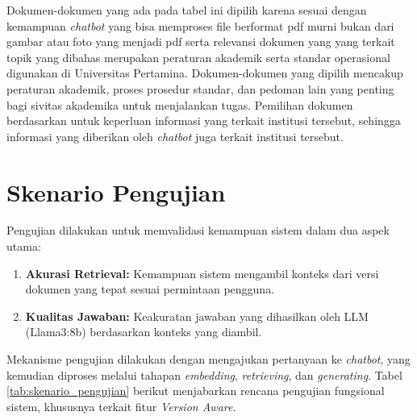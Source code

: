 Dokumen-dokumen yang ada pada tabel ini dipilih karena sesuai dengan kemampuan \textit{chatbot} yang bisa memproses file berformat pdf murni
bukan dari gambar atau foto yang menjadi pdf serta relevansi dokumen yang yang terkait topik yang dibahas merupakan peraturan akademik serta standar
operasional digunakan di Universitas Pertamina. Dokumen-dokumen yang dipilih mencakup peraturan akademik, proses prosedur standar, dan pedoman lain
yang penting bagi sivitas akademika untuk menjalankan tugas. Pemilihan dokumen berdasarkan untuk keperluan informasi yang terkait institusi tersebut, sehingga
informasi yang diberikan oleh \textit{chatbot} juga terkait institusi tersebut.

\newpage
\section{Skenario Pengujian}
\label{sec:skenario_uji}

Pengujian dilakukan untuk memvalidasi kemampuan sistem dalam dua aspek utama:
\begin{enumerate}
    \item \textbf{Akurasi Retrieval:} Kemampuan sistem mengambil konteks dari versi dokumen yang tepat sesuai permintaan pengguna.
    \item \textbf{Kualitas Jawaban:} Keakuratan jawaban yang dihasilkan oleh LLM (Llama3:8b) berdasarkan konteks yang diambil.
\end{enumerate}

Mekanisme pengujian dilakukan dengan mengajukan pertanyaan ke \textit{chatbot}, yang kemudian diproses melalui tahapan \textit{embedding}, \textit{retrieving}, dan \textit{generating}. Tabel \ref{tab:skenario_pengujian} berikut menjabarkan rencana pengujian fungsional sistem, khususnya terkait fitur \textit{Version Aware}.

